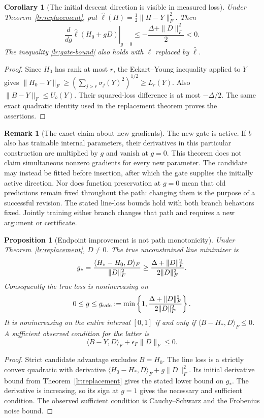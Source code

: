 \documentclass[11pt]{article}
\newtheorem{proposition}[theorem]{Proposition}
\newtheorem{corollary}[theorem]{Corollary}
\theoremstyle{definition}
\newtheorem{remark}[theorem]{Remark}
\begin{document}
\begin{corollary}[The initial descent direction is visible in measured loss]
\label{lr:observed-descent}
Under Theorem~\ref{lr:replacement}, put
$\widehat\ell(H)=\tfrac12\|H-Y\|_F^2$. Then
\[
 \left.\frac{d}{dg}\widehat\ell(H_0+gD)\right|_{g=0}
 \leq-\frac{\Delta+\|D\|_F^2}{2}<0.
\]
The inequality \eqref{lr:gate-bound} also holds with $\ell$ replaced by
$\widehat\ell$.
\end{corollary}
\begin{proof}
Since $H_0$ has rank at most $r$, the Eckart--Young inequality applied
to $Y$ gives
$\|H_0-Y\|_F\geq(\sum_{j>r}\sigma_j(Y)^2)^{1/2}\geq L_r(Y)$.
Also $\|B-Y\|_F\leq U_b(Y)$. Their squared-loss difference is at
most $-\Delta/2$. The same exact quadratic identity used in the
replacement theorem proves the assertions.
\end{proof}

\begin{remark}[The exact claim about new gradients]
The new gate is active. If $b$ also has trainable internal parameters,
their derivatives in this particular construction are multiplied by $g$
and vanish at $g=0$. This theorem does not claim simultaneous nonzero
gradients for every new parameter. The candidate may instead be fitted
before insertion, after which the gate supplies the initially active
direction. Nor does function preservation at $g=0$ mean that old
predictions remain fixed throughout the path: changing them is the
purpose of a successful revision. The stated line-loss bounds hold with
both branch behaviors fixed. Jointly training either branch changes that
path and requires a new argument or certificate.
\end{remark}

\begin{proposition}[Endpoint improvement is not path monotonicity]
\label{lr:monotonicity}
Under Theorem~\ref{lr:replacement}, $D\ne0$. The true unconstrained
line minimizer is
\[
 g_*={\langle H_*-H_0,D\rangle_F\over\|D\|_F^2}
 \geq{\Delta+\|D\|_F^2\over2\|D\|_F^2}.
\]
Consequently the true loss is nonincreasing on
\[
 0\leq g\leq g_{\rm safe}:=
 \min\left\{1,{\Delta+\|D\|_F^2\over2\|D\|_F^2}\right\}.
\]
It is nonincreasing on the entire interval $[0,1]$ if and only if
$\langle B-H_*,D\rangle_F\leq0$. A sufficient observed condition
for the latter is
\[
 \langle B-Y,D\rangle_F+\epsilon_F\|D\|_F\leq0.
\]
\end{proposition}
\begin{proof}
Strict candidate advantage excludes $B=H_0$. The line loss is a
strictly convex quadratic with derivative
$\langle H_0-H_*,D\rangle_F+g\|D\|_F^2$. Its initial derivative
bound from Theorem~\ref{lr:replacement} gives the stated lower bound
on $g_*$. The derivative is increasing, so its sign at $g=1$ gives
the necessary and sufficient condition. The observed sufficient
condition is Cauchy--Schwarz and the Frobenius noise bound.
\end{proof}
\end{document}
